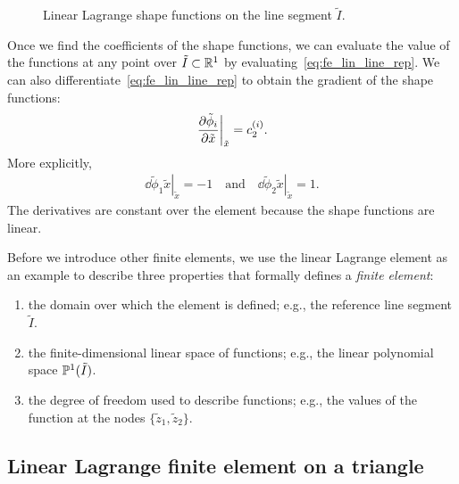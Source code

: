 \begin{figure}
  \centering
  \caption{Linear Lagrange shape functions on the line segment $\tilde I$. \label{fig:fe_shape_line_p1}}
\end{figure}

Once we find the coefficients of the shape functions, we can evaluate the value of the functions at any point over $\tilde I \subset \mathbb{R}^1$ by evaluating~\eqref{eq:fe_lin_line_rep}. We can also differentiate~\eqref{eq:fe_lin_line_rep} to obtain the gradient of the shape functions:
\begin{align*}
  \left. \frac{\partial \tilde \phi_i}{\partial \tilde x} \right|_{\tilde x} = c_2^{(i)}.
\end{align*}
More explicitly,
\begin{align*}
  \left. \dd{\tilde \phi_1}{\tilde x} \right|_{\tilde x} = -1
  \quad \text{and} \quad 
  \left. \dd{\tilde \phi_2}{\tilde x} \right|_{\tilde x} = 1.
\end{align*}
The derivatives are constant over the element because the shape functions are linear.

Before we introduce other finite elements, we use the linear Lagrange element as an example to describe three properties that formally defines a \emph{finite element}:
\begin{enumerate}
\item the domain over which the element is defined; e.g., the reference line segment $\tilde I$.
\item the finite-dimensional linear space of functions; e.g., the linear polynomial space $\mathbb{P}^1(\tilde I)$.
\item the degree of freedom used to describe functions; e.g., the values of the function at the nodes $\{ \tilde z_1, \tilde z_2 \}$.
\end{enumerate}



\subsection{Linear Lagrange finite element on a triangle}
\label{sec:fe_lin_tri}

